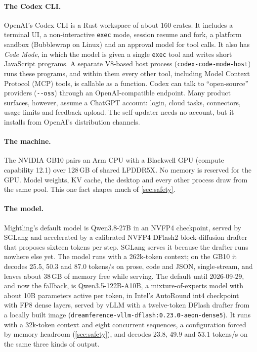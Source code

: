 \documentclass[11pt]{article}
\newcommand{\code}[1]{\texttt{#1}}
\begin{document}
\paragraph{The Codex CLI.} OpenAI's Codex CLI \cite{openai2026codex} is a Rust workspace of about
160 crates. It includes a terminal UI, a non-interactive \code{exec} mode, session
resume and fork, a platform sandbox (Bubblewrap on Linux) and an approval model for tool calls. It
also has \emph{Code Mode}, in which the model is given a single \code{exec} tool and writes short
JavaScript programs. A separate V8-based host process (\code{codex-code-mode-host}) runs these
programs, and within them every other tool, including Model Context Protocol (MCP)
\cite{mcp2025spec} tools, is callable as a function. Codex can talk to ``open-source'' providers
(\code{-{}-oss}) through an OpenAI-compatible endpoint. Many product surfaces, however, assume a
ChatGPT account: login, cloud tasks, connectors, usage limits and feedback upload. The
self-updater needs no account, but it installs from OpenAI's distribution channels.

\paragraph{The machine.} The NVIDIA GB10 pairs an Arm CPU with a Blackwell GPU (compute capability
12.1) over 128\,GB of shared LPDDR5X. No memory is reserved for the GPU. Model weights, KV cache,
the desktop and every other process draw from the same pool. This one fact shapes much of
\cref{sec:safety}.

\paragraph{The model.} Mightling's default model is Qwen3.8-27B in an NVFP4 checkpoint, served by
SGLang and accelerated by a calibrated NVFP4 DFlash2 block-diffusion drafter
\cite{chen2026dflash,dflashdrafter} that proposes sixteen tokens per step. SGLang serves it
because the drafter runs nowhere else yet. The model runs with a 262k-token context; on the GB10 it
decodes 25.5, 50.3 and 87.0 tokens/s on prose, code and JSON, single-stream, and leaves about
38\,GB of memory free while serving. The default until 2026-09-29, and now the fallback, is
Qwen3.5-122B-A10B, a mixture-of-experts model with about 10B parameters active per token, in
Intel's AutoRound int4 checkpoint \cite{qwen35int4,cheng2023autoround} with FP8 dense layers,
served by vLLM \cite{kwon2023vllm} with a twelve-token DFlash drafter from a locally built image
(\code{dreamference-vllm-dflash:0.23.0-aeon-dense5}). It runs with a 32k-token context and eight
concurrent sequences, a configuration forced by memory headroom (\cref{sec:safety}), and decodes
23.8, 49.9 and 53.1 tokens/s on the same three kinds of output.
\end{document}
